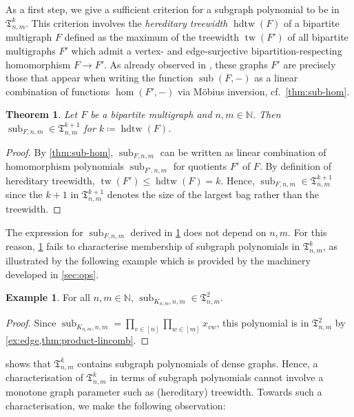 \documentclass[11pt, DIV=15]{scrarticle}
\theoremstyle{definition}
\newtheorem{example}[definition]{Example}
\theoremstyle{plain}
\newtheorem{theorem}[definition]{Theorem}
\theoremstyle{remark}
\DeclareMathOperator{\tw}{tw}
\DeclareMathOperator{\hdtw}{hdtw}
\DeclareMathOperator{\sub}{sub}
\begin{document}
	As a first step, we give a sufficient criterion for a subgraph polynomial to be in $\mathfrak{T}^k_{n,m}$.
	This criterion involves the \emph{hereditary treewidth} $\hdtw(F)$ of a bipartite multigraph $F$ defined as the maximum of the treewidth $\tw(F')$ of all bipartite multigraphs $F'$ which admit a vertex- and edge-surjective bipartition-respecting homomorphism $F \to F'$.
	As already observed in \cite{curticapean_homomorphisms_2017}, these graphs $F'$ are precisely those that appear when writing the function $\sub(F, -)$ as a linear combination of functions $\hom(F', -)$ via Möbius inversion, cf.\ \cref{thm:sub-hom}.
	
	\begin{theorem}\label{thm:sub-hom-poly}
		Let $F$ be a bipartite multigraph and $n,m \in \mathbb{N}$.
		Then $\sub_{F, n,m} \in \mathfrak{T}^{k+1}_{n,m}$ for $k \coloneqq \hdtw(F)$.
	\end{theorem}
	\begin{proof}
		By \cref{thm:sub-hom}, $\sub_{F, n,m}$ can be written as linear combination of homomorphism polynomials $\sub_{F', n,m}$ for quotients $F'$ of $F$.
		By definition of hereditary treewidth, $\tw(F') \leq \hdtw(F) = k$.
		Hence, $\sub_{F, n,m} \in \mathfrak{T}^{k+1}_{n,m}$ since the $k+1$ in $ \mathfrak{T}^{k+1}_{n,m}$ denotes the size of the largest bag rather than the treewidth.
	\end{proof}

	The expression for $\sub_{F, n,m}$ derived in \cref{thm:sub-hom-poly} does not depend on $n,m$.
	For this reason, \cref{thm:sub-hom-poly} fails to characterise membership of subgraph polynomials in $\mathfrak{T}^k_{n,m}$,
	as illustrated by the following example which is provided by the machinery developed in \cref{sec:ops}.
	\begin{example} \label{ex:knm}
		For all $n,m \in \mathbb{N}$,
		$\sub_{K_{n,m}, n,m} \in \mathfrak{T}^2_{n,m}$.
	\end{example}
	\begin{proof}
		Since $\sub_{K_{n,m}, n,m} = \prod_{v\in [n]}
                \prod_{w \in [m]} x_{vw}$, this polynomial is in $\mathfrak{T}^2_{n,m}$ by \cref{ex:edge,thm:product-lincomb}.
	\end{proof}
	
	 shows that $\mathfrak{T}^k_{n,m}$ contains subgraph polynomials of dense graphs.
	Hence, a characterisation of $\mathfrak{T}^k_{n,m}$ in terms of subgraph polynomials cannot involve a monotone graph parameter such as (hereditary) treewidth.
	Towards such a characterisation, we make the following observation:
	
\end{document}
